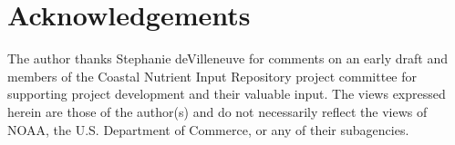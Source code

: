 \documentclass[fleqn,10pt,lineno]{wlpeerj} %
\begin{document}
\hypertarget{acknowledgements}{%
\section*{Acknowledgements}\label{acknowledgements}}

The author thanks Stephanie deVilleneuve for comments on an early draft
and members of the Coastal Nutrient Input Repository project committee
for supporting project development and their valuable input. The views
expressed herein are those of the author(s) and do not necessarily
reflect the views of NOAA, the U.S. Department of Commerce, or any of
their subagencies.

\printbibliography
\end{document}

